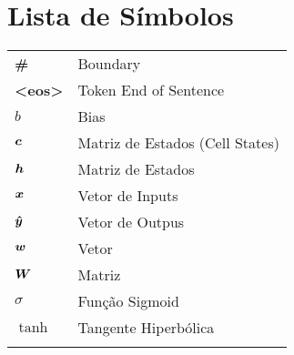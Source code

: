 \chapter{Lista de Símbolos}
\begin{tabular}{ll}
\vspace{2mm}
\textbf{\#}   &Boundary\\ \vspace{2mm}
\textbf{<eos>}   &Token End of Sentence\\ \vspace{2mm}
$b$    &Bias\\ \vspace{2mm}
$\bm{c}$    &Matriz de Estados (Cell States)\\ \vspace{2mm}
$\bm{h}$    &Matriz de Estados\\ \vspace{2mm}
$\bm{x}$    &Vetor de Inputs\\ \vspace{2mm}
$\bm{\hat{y}}$    &Vetor de Outpus\\ \vspace{2mm}
$\bm{w}$    &Vetor\\ \vspace{2mm}
$\bm{W}$    &Matriz\\ \vspace{2mm}
$\sigma$ & Função Sigmoid \\ \vspace{2mm}
$\tanh$ & Tangente Hiperbólica \\ \vspace{2mm}
\end{tabular}
